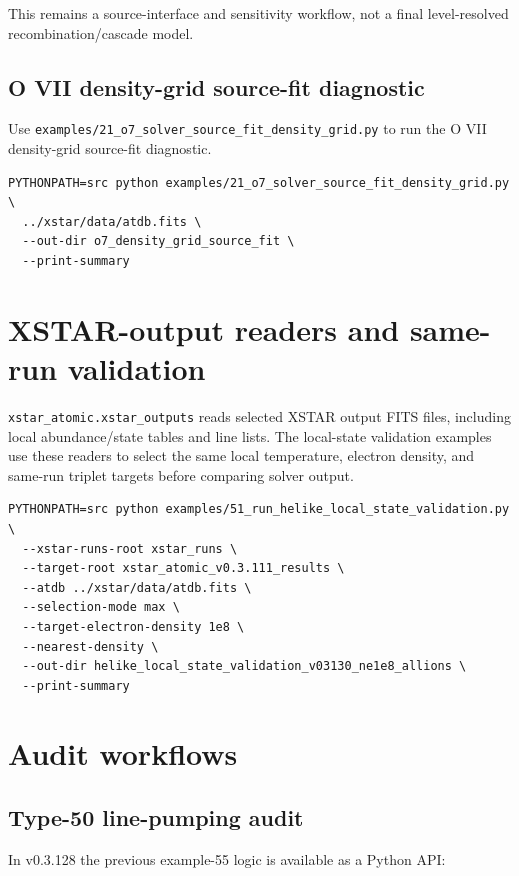 \documentclass[11pt]{article}
\begin{document}
This remains a source-interface and sensitivity workflow, not a final level-resolved recombination/cascade model.

\subsection{O VII density-grid source-fit diagnostic}

Use \texttt{examples/21\_o7\_solver\_source\_fit\_density\_grid.py} to run the O VII density-grid source-fit diagnostic.

\begin{lstlisting}[style=ctterminal]
PYTHONPATH=src python examples/21_o7_solver_source_fit_density_grid.py \
  ../xstar/data/atdb.fits \
  --out-dir o7_density_grid_source_fit \
  --print-summary
\end{lstlisting}

\section{XSTAR-output readers and same-run validation}

\texttt{xstar\_atomic.xstar\_outputs} reads selected XSTAR output FITS files, including local abundance/state tables and line lists. The local-state validation examples use these readers to select the same local temperature, electron density, and same-run triplet targets before comparing solver output.

\begin{lstlisting}[style=ctterminal]
PYTHONPATH=src python examples/51_run_helike_local_state_validation.py \
  --xstar-runs-root xstar_runs \
  --target-root xstar_atomic_v0.3.111_results \
  --atdb ../xstar/data/atdb.fits \
  --selection-mode max \
  --target-electron-density 1e8 \
  --nearest-density \
  --out-dir helike_local_state_validation_v03130_ne1e8_allions \
  --print-summary
\end{lstlisting}

\section{Audit workflows}

\subsection{Type-50 line-pumping audit}

In v0.3.128 the previous example-55 logic is available as a Python API:
\end{document}
